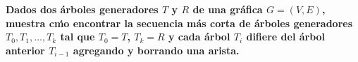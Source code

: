 \textbf{Dados dos \'arboles generadores $T$ y $R$ de una gr\'afica $G = (V, E)$, muestra c\'mo encontrar la secuencia m\'as corta de \'arboles generadores $T_0, T_1, \dots, T_k$ tal que $T_0 = T$, $T_k = R$ y cada \'arbol $T_i$ difiere del \'arbol anterior $T_{i-1}$ agregando y borrando una arista.}\vspace{.2cm}

\textcolor{bibi}{}
\begin{quote}
\end{quote}
